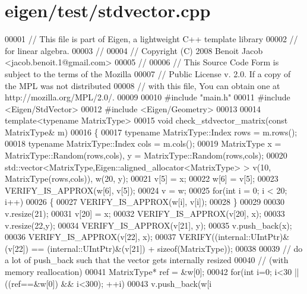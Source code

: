 \hypertarget{eigen_2test_2stdvector_8cpp_source}{}\section{eigen/test/stdvector.cpp}
\label{eigen_2test_2stdvector_8cpp_source}

\begin{DoxyCode}
00001 \textcolor{comment}{// This file is part of Eigen, a lightweight C++ template library}
00002 \textcolor{comment}{// for linear algebra.}
00003 \textcolor{comment}{//}
00004 \textcolor{comment}{// Copyright (C) 2008 Benoit Jacob <jacob.benoit.1@gmail.com>}
00005 \textcolor{comment}{//}
00006 \textcolor{comment}{// This Source Code Form is subject to the terms of the Mozilla}
00007 \textcolor{comment}{// Public License v. 2.0. If a copy of the MPL was not distributed}
00008 \textcolor{comment}{// with this file, You can obtain one at http://mozilla.org/MPL/2.0/.}
00009 
00010 \textcolor{preprocessor}{#include "main.h"}
00011 \textcolor{preprocessor}{#include <Eigen/StdVector>}
00012 \textcolor{preprocessor}{#include <Eigen/Geometry>}
00013 
00014 \textcolor{keyword}{template}<\textcolor{keyword}{typename} MatrixType>
00015 \textcolor{keywordtype}{void} check\_stdvector\_matrix(\textcolor{keyword}{const} MatrixType& m)
00016 \{
00017   \textcolor{keyword}{typename} MatrixType::Index rows = m.rows();
00018   \textcolor{keyword}{typename} MatrixType::Index cols = m.cols();
00019   MatrixType x = MatrixType::Random(rows,cols), y = MatrixType::Random(rows,cols);
00020   std::vector<MatrixType,Eigen::aligned\_allocator<MatrixType> > v(10, MatrixType(rows,cols)), w(20, y);
00021   v[5] = x;
00022   w[6] = v[5];
00023   VERIFY\_IS\_APPROX(w[6], v[5]);
00024   v = w;
00025   \textcolor{keywordflow}{for}(\textcolor{keywordtype}{int} i = 0; i < 20; i++)
00026   \{
00027     VERIFY\_IS\_APPROX(w[i], v[i]);
00028   \}
00029 
00030   v.resize(21);
00031   v[20] = x;
00032   VERIFY\_IS\_APPROX(v[20], x);
00033   v.resize(22,y);
00034   VERIFY\_IS\_APPROX(v[21], y);
00035   v.push\_back(x);
00036   VERIFY\_IS\_APPROX(v[22], x);
00037   VERIFY((internal::UIntPtr)&(v[22]) == (internal::UIntPtr)&(v[21]) + \textcolor{keyword}{sizeof}(MatrixType));
00038 
00039   \textcolor{comment}{// do a lot of push\_back such that the vector gets internally resized}
00040   \textcolor{comment}{// (with memory reallocation)}
00041   MatrixType* ref = &w[0];
00042   \textcolor{keywordflow}{for}(\textcolor{keywordtype}{int} i=0; i<30 || ((ref==&w[0]) && i<300); ++i)
00043     v.push\_back(w[i%

\end{DoxyCode}
